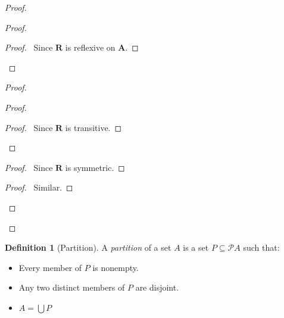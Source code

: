 \documentclass{article}
\let\qed\relax
\theoremstyle{definition}
\newtheorem{definition}[axiom]{Definition}
\begin{document}
    \begin{proof}
        \pf
        \begin{proof}
            \begin{proof}
                \pf\ Since $\mathbf{R}$ is reflexive on $\mathbf{A}$.
            \end{proof}
        \end{proof}
        \begin{proof}
            \begin{proof}
                \begin{proof}
                    \pf\ Since $\mathbf{R}$ is transitive.
                \end{proof}
            \end{proof}
            \begin{proof}
                \pf\ Since $\mathbf{R}$ is symmetric.
            \end{proof}
            \begin{proof}
                \pf\ Similar.
            \end{proof}
        \end{proof}
        \qed
    \end{proof}

    \begin{definition}[Partition]
        A \emph{partition} of a set $A$ is a set $P \subseteq \mathcal{P} A$ such that:
        \begin{itemize}
            \item Every member of $P$ is nonempty.
            \item Any two distinct members of $P$ are disjoint.
            \item $A = \bigcup P$
        \end{itemize}
    \end{definition}
\end{document}
